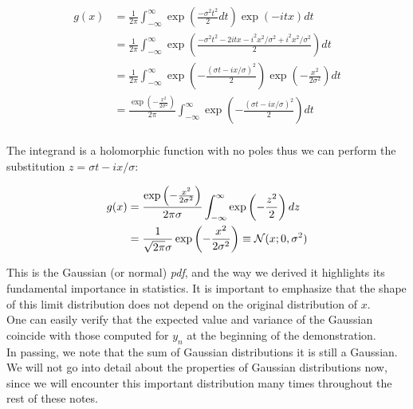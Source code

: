 	\begin{align*}
	g(x)&=\frac{1}{2 \pi}\int_{-\infty}^{\infty}\exp\left(\frac{-\sigma^2t^2}{2}dt\right)\exp\left(-itx\right) dt\\
	&=\frac{1}{2 \pi}\int_{-\infty}^{\infty}\exp\left(\frac{-\sigma^2t^2-2itx-i^2x^2/ \sigma^2+i^2x^2/ \sigma^2}{2}\right) dt\\
	&=\frac{1}{2 \pi}\int_{-\infty}^{\infty}\exp\left(-\frac{\left(\sigma t -ix/\sigma \right)^2}{2}\right)\exp\left(-\frac{x^2}{2\sigma^2}\right) dt\\
	&=\frac{\exp\left(-\frac{x^2}{2\sigma^2}\right)}{2 \pi}\int_{-\infty}^{\infty}\exp\left(-\frac{\left(\sigma t -ix/\sigma \right)^2}{2}\right)dt\\
	\end{align*}

The integrand is a holomorphic function with no poles thus we can perform the substitution $z=\sigma t -ix/\sigma$:

	\begin{align*}
	g(x)&=\frac{\exp\left(-\frac{x^2}{2\sigma^2}\right)}{2 \pi\sigma}\int_{-\infty}^{\infty}\exp\left(-\frac{z^2}{2}\right)dz\\
	&=\frac{1}{\sqrt{2\pi}\sigma}\exp\left(-\frac{x^2}{2\sigma^2}\right) \equiv \mathcal{N}(x; 0, \sigma^2)
	\end{align*}

This is the Gaussian (or normal) \emph{pdf}, and the way we derived it highlights its fundamental importance in statistics. It is important to emphasize that the shape of this limit distribution does not depend on the original distribution of $x$.\\
One can easily verify that the expected value and variance of the Gaussian coincide with those computed for $y_n$ at the beginning of the demonstration. \\
In passing, we note that the sum of Gaussian distributions it is still a Gaussian. We will not go into detail about the properties of Gaussian distributions now, since we will encounter this important distribution many times throughout the rest of these notes.

